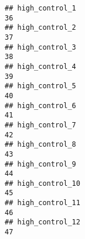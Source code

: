 \documentclass[
]{article}
\begin{document}
\begin{verbatim}
## high_control_1                                                                                                                                                                                                               36
## high_control_2                                                                                                                                                                                                               37
## high_control_3                                                                                                                                                                                                               38
## high_control_4                                                                                                                                                                                                               39
## high_control_5                                                                                                                                                                                                               40
## high_control_6                                                                                                                                                                                                               41
## high_control_7                                                                                                                                                                                                               42
## high_control_8                                                                                                                                                                                                               43
## high_control_9                                                                                                                                                                                                               44
## high_control_10                                                                                                                                                                                                              45
## high_control_11                                                                                                                                                                                                              46
## high_control_12                                                                                                                                                                                                              47

\end{verbatim}
\end{document}
